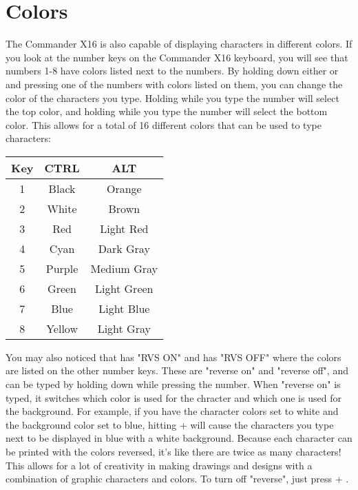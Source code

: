\chapter*{Colors}

The Commander X16 is also capable of displaying characters in different colors.
If you look at the number keys on the Commander X16 keyboard, you will see that
numbers 1-8 have colors listed next to the numbers.  By holding down either
\altkey or \ctrlkey and pressing one of the numbers with colors listed on them,
you can change the color of the characters you type.  Holding \ctrlkey while
you type the number will select the top color, and holding \altkey while you
type the number will select the bottom color.  This allows for a total of 16
different colors that can be used to type characters:\\

\begin{tabular}{|c|c|c|}
	\hline
	Key & CTRL & ALT\\ \hline
	1 & Black & Orange \\ \hline
	2 & White & Brown \\ \hline
	3 & Red & Light Red \\ \hline
	4 & Cyan & Dark Gray\\ \hline
	5 & Purple & Medium Gray\\ \hline
	6 & Green & Light Green\\ \hline
	7 & Blue & Light Blue\\ \hline
	8 & Yellow & Light Gray\\ \hline
\end{tabular}

\vspace{16pt}

You may also noticed that  has "RVS ON" and  has "RVS OFF" where
the colors are listed on the other number keys.  These are "reverse on" and
"reverse off", and can be typed by holding down \ctrlkey while pressing the
number.  When "reverse on" is typed, it switches which color is used for the
chracter and which one is used for the background.  For example, if you have
the character colors set to white and the background color set to blue, hitting
\ctrlkey +  will cause the characters you type next to be displayed in
blue with a white background.  Because each character can be printed with the
colors reversed, it's like there are twice as many characters!  This allows for
a lot of creativity in making drawings and designs with a combination of
graphic characters and colors.  To turn off "reverse", just press \ctrlkey +
.\\

